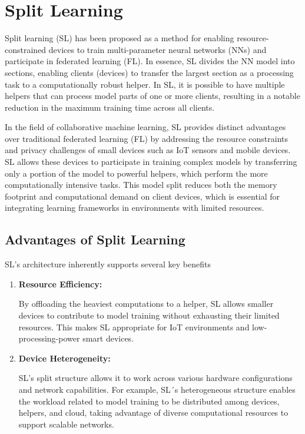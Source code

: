 \section{Split Learning}
\label{sec:split_learning}

Split learning (SL) has been proposed as a method for enabling resource-constrained devices to train multi-parameter neural networks (NNs) and participate in federated learning (FL). In essence, SL divides the NN model into sections, enabling clients (devices) to transfer the largest section as a processing task to a computationally robust helper. In SL, it is possible to have multiple helpers that can process model parts of one or more clients, resulting in a notable reduction in the maximum training time across all clients.

In the field of collaborative machine learning, SL provides distinct advantages over traditional federated learning (FL) by addressing the resource constraints and privacy challenges of small devices such as IoT sensors and mobile devices. SL allows these devices to participate in training complex models by transferring only a portion of the model to powerful helpers, which perform the more computationally intensive tasks. This model split reduces both the memory footprint and computational demand on client devices, which is essential for integrating learning frameworks in environments with limited resources.

\subsection{Advantages of Split Learning}
\label{sec:advantages_of_sl}

SL’s architecture inherently supports several key benefits

\begin{enumerate}
	\item \textbf{Resource Efficiency:} 
	
	By offloading the heaviest computations to a helper, SL allows smaller devices to contribute to model training without exhausting their limited resources. This makes SL appropriate for IoT environments and low-processing-power smart devices.
	
	\item \textbf{Device Heterogeneity:} 
	
	SL’s split structure allows it to work across various hardware configurations and network capabilities. For example, SL´s heterogeneous structure enables the workload related to model training to be distributed among devices, helpers, and cloud, taking advantage of diverse computational resources to support scalable networks.
\end{enumerate}

